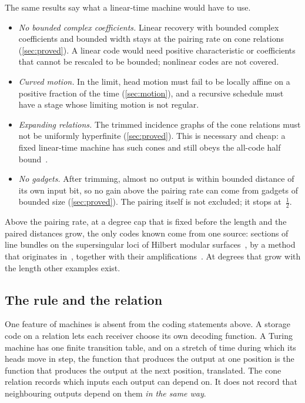 The same results say what a linear-time machine would have to use.
\begin{itemize}[leftmargin=1.5em]
\item \emph{No bounded complex coefficients.} Linear recovery with bounded complex coefficients and bounded width
stays at the pairing rate on cone relations (\cref{sec:proved}). A linear code would need positive characteristic or
coefficients that cannot be rescaled to be bounded; nonlinear codes are not covered.
\item \emph{Curved motion.} In the limit, head motion must fail to be locally affine on a positive fraction of the
time (\cref{sec:motion}), and a recursive schedule must have a stage whose limiting motion is not regular.
\item \emph{Expanding relations.} The trimmed incidence graphs of the cone relations must not be uniformly hyperfinite
(\cref{sec:proved}). This is necessary and cheap: a fixed linear-time machine has such cones and still obeys the
all-code half bound~\cite[Corollary~7.9]{DirectedRecovery2026}.
\item \emph{No gadgets.} After trimming, almost no output is within bounded distance of its own input bit, so no gain
above the pairing rate can come from gadgets of bounded size (\cref{sec:proved}). The pairing itself is not excluded;
it stops at~$\tfrac12$.
\end{itemize}
Above the pairing rate, at a degree cap that is fixed before the length and the paired distances grow, the only codes
known come from one source: sections of line bundles on the supersingular loci of Hilbert modular
surfaces~\cite{StorageCodes2026}, by a method that originates in~\cite{Luck2026}, together with their
amplifications~\cite{HighRate2026}. At degrees that grow with the length other examples exist.

\subsection{The rule and the relation}\label{sec:rule}

One feature of machines is absent from the coding statements above. A storage code on a relation lets each receiver
choose its own decoding function. A Turing machine has one finite transition table, and on a stretch of time during
which its heads move in step, the function that produces the output at one position is the function that produces the
output at the next position, translated. The cone relation records which inputs each output can depend on. It does not
record that neighbouring outputs depend on them \emph{in the same way}.

